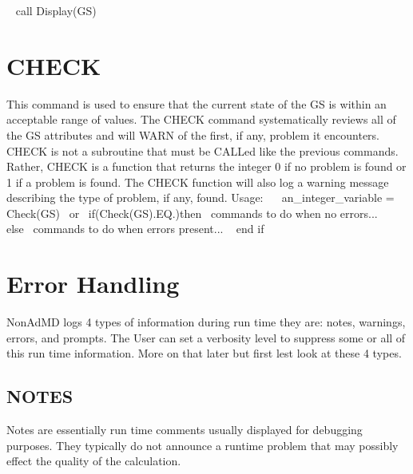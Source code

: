 ~\newline
 call Display(\+G\+S)~\newline
\hypertarget{_interface_CHECK}{}\section{C\+H\+E\+C\+K}\label{_interface_CHECK}
This command is used to ensure that the current state of the G\+S is within an acceptable range of values. The C\+H\+E\+C\+K command systematically reviews all of the G\+S attributes and will W\+A\+R\+N of the first, if any, problem it encounters. C\+H\+E\+C\+K is not a subroutine that must be C\+A\+L\+Led like the previous commands. Rather, C\+H\+E\+C\+K is a function that returns the integer 0 if no problem is found or 1 if a problem is found. The C\+H\+E\+C\+K function will also log a warning message describing the type of problem, if any, found. Usage\+:~\newline
~\newline
 an\+\_\+integer\+\_\+variable = Check(\+G\+S)~\newline
 or~\newline
 if(Check(\+G\+S).E\+Q.)then~\newline
  commands to do when no errors...~\newline
 else~\newline
  commands to do when errors present... ~\newline
 end if~\newline
~\newline
\hypertarget{_interface_Error_Handling}{}\section{Error Handling}\label{_interface_Error_Handling}
Non\+Ad\+M\+D logs 4 types of information during run time they are\+: notes, warnings, errors, and prompts. The User can set a verbosity level to suppress some or all of this run time information. More on that later but first lest look at these 4 types.~\newline
\hypertarget{_interface_NOTES}{}\subsection{N\+O\+T\+E\+S}\label{_interface_NOTES}
Notes are essentially run time comments usually displayed for debugging purposes. They typically do not announce a runtime problem that may possibly effect the quality of the calculation.~\newline
